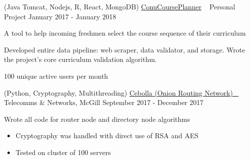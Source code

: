 \begin{cventries}

\cventry
{(Java Tomcat, Nodejs, R, React, MongoDB)} %
{\href{http://conucourseplanner.online}{ConuCoursePlanner} \ \href{http://conucourseplanner.online/}{\color{darkblue}{\faLink}} \href{https://github.com/stumash/CoursePlanner}{\faGithubSquare\acvHeaderIconSep}} %
{Personal Project} %
{January 2017 - January 2018} %
{ %
\begin{cvitems}
\item {A tool to help incoming freshmen select the course sequence of their curriculum}
\item {Developed entire data pipeline: web scraper, data validator, and storage. Wrote the project's core curriculum validation algorithm.}
\item {100 unique active users per month}
\end{cvitems}
}


\cventry
{(Python, Cryptography, Multithreading)} %
{\href{https://github.com/CamiloGarciaLaRotta/Cebolla}{Cebolla (Onion Routing Network) \ \faGithubSquare\acvHeaderIconSep} \href{https://www.youtube.com/watch?v=jR9N_xxLs6A}{\color{darkred}{\faYoutubePlay}}} %
{Telecomms \& Networks, McGill} %
{September 2017 - December 2017} %
{ %
\begin{cvitems}
\item {Wrote all code for router node and directory node algorithms}
    \begin{itemize}
        \item {Cryptography was handled with direct use of RSA and AES}
        \item {Tested on cluster of 100 servers}
    \end{itemize}
\end{cvitems}
}


\end{cventries}
